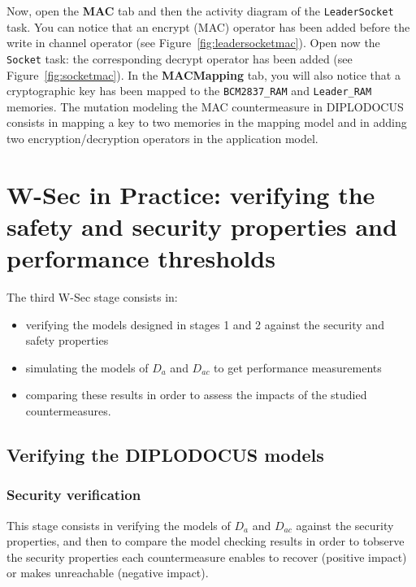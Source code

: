 \documentclass{article}
\begin{document}
Now, open the \textbf{MAC} tab and then the activity diagram of the \texttt{LeaderSocket} task. You can notice that an encrypt (MAC) operator has been added before the write in channel operator (see Figure~\ref{fig:leadersocketmac}). Open now the \texttt{Socket} task: the corresponding decrypt operator has been added (see Figure~\ref{fig:socketmac}). In the \textbf{MACMapping} tab, you will also notice that a cryptographic key has been mapped to the \texttt{BCM2837\_RAM} and \texttt{Leader\_RAM} memories. The mutation modeling the MAC countermeasure in DIPLODOCUS consists in mapping a key to two memories in the mapping model and in adding two encryption/decryption operators in the application model.


\section{W-Sec in Practice: verifying the safety and security properties and performance thresholds}

The third W-Sec stage consists in:
\begin{itemize}
	\item verifying the models designed in stages 1 and 2 against the security and safety properties
	\item simulating the models of $D_a$ and $D_{a c}$ to get performance measurements
	\item comparing these results in order to assess the impacts of the studied countermeasures.
\end{itemize}

\subsection{Verifying the DIPLODOCUS models}

\subsubsection{Security verification}

This stage consists in verifying the models of $D_a$ and $D_{a c}$ against the security properties, and then to compare the model checking results in order to tobserve the security properties each countermeasure enables to recover (positive impact) or makes unreachable (negative impact).
\end{document}
